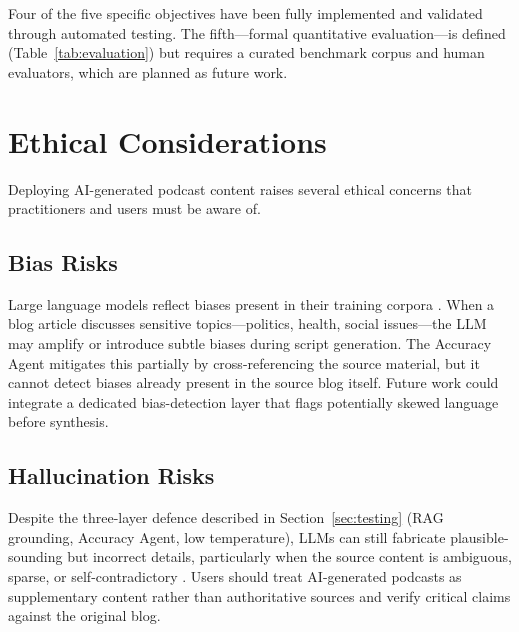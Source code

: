 \documentclass[sigconf,natbib=false]{acmart}   %
\begin{document}
Four of the five specific objectives have been fully implemented and validated through automated testing.  The fifth---formal quantitative evaluation---is defined (Table~\ref{tab:evaluation}) but requires a curated benchmark corpus and human evaluators, which are planned as future work.

\section{Ethical Considerations}
\label{sec:ethics}

Deploying AI-generated podcast content raises several ethical concerns that practitioners and users must be aware of.

\subsection{Bias Risks}
Large language models reflect biases present in their training corpora \cite{Bender2021Parrots}.  When a blog article discusses sensitive topics---politics, health, social issues---the LLM may amplify or introduce subtle biases during script generation.  The Accuracy Agent mitigates this partially by cross-referencing the source material, but it cannot detect biases already present in the source blog itself.  Future work could integrate a dedicated bias-detection layer that flags potentially skewed language before synthesis.

\subsection{Hallucination Risks}
Despite the three-layer defence described in Section~\ref{sec:testing} (RAG grounding, Accuracy Agent, low temperature), LLMs can still fabricate plausible-sounding but incorrect details, particularly when the source content is ambiguous, sparse, or self-contradictory \cite{Weidinger2022Taxonomy}.  Users should treat AI-generated podcasts as supplementary content rather than authoritative sources and verify critical claims against the original blog.
\end{document}
